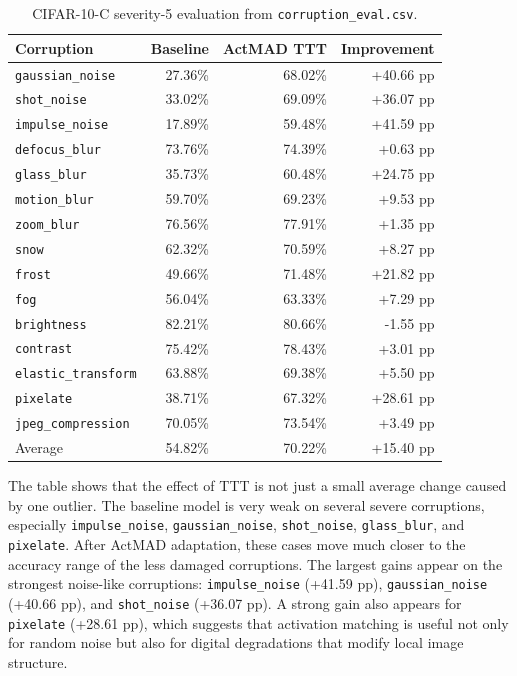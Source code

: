 \documentclass[a4paper,11pt]{article}
\begin{document}
\begin{table}[H]
\centering
\small
\caption{CIFAR-10-C severity-5 evaluation from \texttt{corruption\_eval.csv}.}
\label{tab:corruption-eval}
\begin{tabular}{lrrr}
\toprule
Corruption & Baseline & ActMAD TTT & Improvement\\
\midrule
\texttt{gaussian\_noise} & 27.36\% & 68.02\% & +40.66 pp\\
\texttt{shot\_noise} & 33.02\% & 69.09\% & +36.07 pp\\
\texttt{impulse\_noise} & 17.89\% & 59.48\% & +41.59 pp\\
\texttt{defocus\_blur} & 73.76\% & 74.39\% & +0.63 pp\\
\texttt{glass\_blur} & 35.73\% & 60.48\% & +24.75 pp\\
\texttt{motion\_blur} & 59.70\% & 69.23\% & +9.53 pp\\
\texttt{zoom\_blur} & 76.56\% & 77.91\% & +1.35 pp\\
\texttt{snow} & 62.32\% & 70.59\% & +8.27 pp\\
\texttt{frost} & 49.66\% & 71.48\% & +21.82 pp\\
\texttt{fog} & 56.04\% & 63.33\% & +7.29 pp\\
\texttt{brightness} & 82.21\% & 80.66\% & -1.55 pp\\
\texttt{contrast} & 75.42\% & 78.43\% & +3.01 pp\\
\texttt{elastic\_transform} & 63.88\% & 69.38\% & +5.50 pp\\
\texttt{pixelate} & 38.71\% & 67.32\% & +28.61 pp\\
\texttt{jpeg\_compression} & 70.05\% & 73.54\% & +3.49 pp\\
\midrule
Average & 54.82\% & 70.22\% & +15.40 pp\\
\bottomrule
\end{tabular}
\end{table}

The table shows that the effect of TTT is not just a small average change caused by one outlier. The baseline model is very weak on several severe corruptions, especially \texttt{impulse\_noise}, \texttt{gaussian\_noise}, \texttt{shot\_noise}, \texttt{glass\_blur}, and \texttt{pixelate}. After ActMAD adaptation, these cases move much closer to the accuracy range of the less damaged corruptions. The largest gains appear on the strongest noise-like corruptions: \texttt{impulse\_noise} (+41.59 pp), \texttt{gaussian\_noise} (+40.66 pp), and \texttt{shot\_noise} (+36.07 pp). A strong gain also appears for \texttt{pixelate} (+28.61 pp), which suggests that activation matching is useful not only for random noise but also for digital degradations that modify local image structure.
\end{document}
